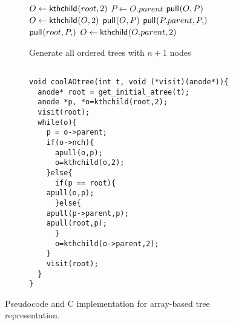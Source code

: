 \begin{figure}
    \centering
    \begin{subfigure}[t]{.49 \textwidth}
	\begin{center}
	    \begin{algorithm}[H] %
	    \begin{algorithmic}
		\State $O\gets \mathsf{kthchild}_{}(root,2)$
	\State {}
	    \State $P \gets O.parent$
		\State $\mathsf{pull}_{}(O,P)$
		\State $O \gets \mathsf{kthchild}_{}(O,2)$
	    \Else
		\State $\mathsf{pull}_{}(O,P)$
		\Else
		\State $\pull{P.parent,P}$
		\State $\pull{root,P}$
		\EndIf
		\State $O \gets \mathsf{kthchild}_{}(O.parent,2)$
	    \EndIf
	\State {}
        \EndWhile
    \EndFunction
	    \end{algorithmic}
    \caption*{Generate all ordered trees with $n+1$ nodes}
	\end{algorithm}
	\end{center}
	\label{fig:}
    \end{subfigure}
    \begin{subfigure}[t]{.5 \textwidth}
	\begin{center}
	    \vspace{.9em} %
\begin{Verbatim}[]

void coolAOtree(int t, void (*visit)(anode*)){
  anode* root = get_initial_atree(t);
  anode *p, *o=kthchild(root,2);
  visit(root);
  while(o){
    p = o->parent;
    if(o->nch){
      apull(o,p);
      o=kthchild(o,2);
    }else{
      if(p == root){
	apull(o,p);
      }else{
	apull(p->parent,p);
	apull(root,p);
      }
      o=kthchild(o->parent,2);
    }
    visit(root);
  }
}

\end{Verbatim}
	\end{center}
	\label{fig:}
    \end{subfigure}
    \cprotect\caption{Pseudocode and C implementation for array-based tree representation.}
    \label{fig:aotreeCode}
\end{figure}

